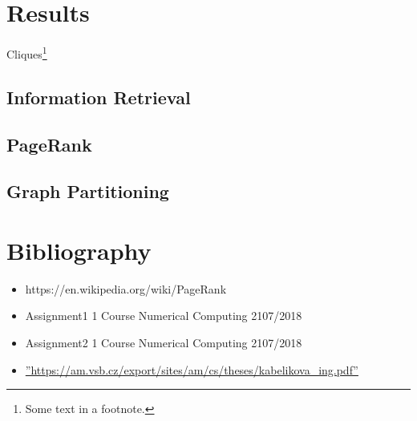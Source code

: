 \documentclass[12 pt]{article}
\begin{document}
\section{Results}
Cliques\footnote{Some text in a footnote.}
\subsection{Information Retrieval}
\subsection{PageRank}
\subsection{Graph Partitioning}
\section{Bibliography}
\begin{itemize}
\item https://en.wikipedia.org/wiki/PageRank
\item Assignment1 1 Course Numerical Computing 2107/2018
\item Assignment2 1 Course Numerical Computing 2107/2018
\item \hyperref[label_name]{''https://am.vsb.cz/export/sites/am/cs/theses/kabelikova\_ing.pdf''}
\end{itemize}
\end{document}
